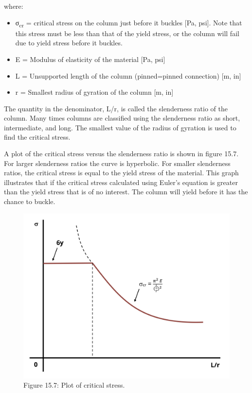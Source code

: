 \documentclass[
  letterpaper,
  DIV=11,
  numbers=noendperiod]{scrreprt}
\begin{document}
where:

\begin{itemize}
\item
  σ\textsubscript{cr} = critical stress on the column just before it
  buckles {[}Pa, psi{]}. Note that this stress must be less than that of
  the yield stress, or the column will fail due to yield stress before
  it buckles.
\item
  E = Modulus of elasticity of the material {[}Pa, psi{]}
\item
  L = Unsupported length of the column (pinned=pinned connection) {[}m,
  in{]}
\item
  r = Smallest radius of gyration of the column {[}m, in{]}
\end{itemize}

The quantity in the denominator, L/r, is called the slenderness ratio of
the column. Many times columns are classified using the slenderness
ratio as short, intermediate, and long. The smallest value of the radius
of gyration is used to find the critical stress.

A plot of the critical stress versus the slenderness ratio is shown in
figure 15.7. For larger slenderness ratios the curve is hyperbolic. For
smaller slenderness ratios, the critical stress is equal to the yield
stress of the material. This graph illustrates that if the critical
stress calculated using Euler's equation is greater than the yield
stress that is of no interest. The column will yield before it has the
chance to buckle.

\begin{figure}[H]

{\centering \includegraphics{images/CH15s PNGs/figure 15.7.png}

}

\caption{Figure 15.7: Plot of critical stress.}

\end{figure}%
\end{document}
